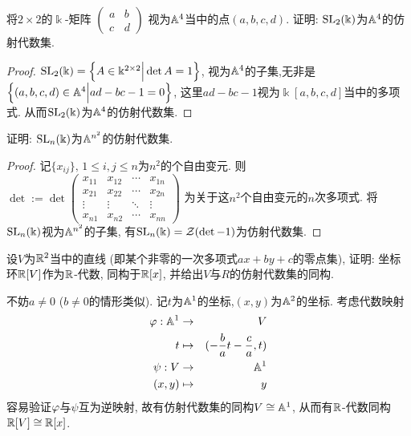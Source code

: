 \documentclass[oneside,a4papar,11pt,UTF8]{book}
\begin{document}
\begin{enumerate}
  \begin{prob}\label{ex-15-1-21}
    将$2\times 2$的$\Bbbk$-矩阵
    $\begin{pmatrix}
       a & b \\
       c & d
     \end{pmatrix}$
    视为$\mathbb{A}^4$当中的点$(a,b,c,d)$.
    证明: $\operatorname{SL}_2(\Bbbk)$为$\mathbb{A}^4$的仿射代数集.
  \end{prob}

  \begin{proof}
    $\operatorname{SL}_2(\Bbbk)=\Big\{ A\in\Bbbk^{2\times 2} \Big| \det A=1 \Big\}$,
    视为$\mathbb{A}^4$的子集,无非是
    $\Big\{ (a,b,c,d)\in\mathbb{A}^4 \Big| ad-bc-1=0 \Big\}$,
    这里$ad-bc-1$视为$\Bbbk[a,b,c,d]$当中的多项式.
    从而$\operatorname{SL}_2(\Bbbk)$为$\mathbb{A}^4$的仿射代数集.
  \end{proof}

  \begin{prob}\label{ex-15-1-22}
    证明: $\operatorname{SL}_n(\Bbbk)$为$\mathbb{A}^{n^2}$的仿射代数集.
  \end{prob}

  \begin{proof}
    记$\{x_{ij}\},\,1\leq i,j\leq n$为$n^2$的个自由变元.
    则$\det:=\det\begin{pmatrix}
                  x_{11} & x_{12} & \cdots & x_{1n} \\
                  x_{21} & x_{22} & \cdots & x_{2n} \\
                  \vdots & \vdots & \ddots & \vdots \\
                  x_{n1} & x_{n2} & \cdots & x_{nn}
                \end{pmatrix}$
  为关于这$n^2$个自由变元的$n$次多项式.
  将$\operatorname{SL}_n(\Bbbk)$视为$\mathbb{A}^{n^2}$的子集,
  有$\operatorname{SL}_n(\Bbbk)=\mathcal{Z}(\det-1)$为仿射代数集.
  \end{proof}

  \begin{prob}\label{ex-15-1-23}
    设$V$为$\mathbb{R}^2$当中的直线
    (即某个非零的一次多项式$ax+by+c$的零点集),
    证明: 坐标环$\mathbb{R}[V]$作为$\mathbb{R}$-代数,
    同构于$\mathbb{R}[x]$,
    并给出$V$与$R$的仿射代数集的同构.
  \end{prob}

  \begin{solution}
    不妨$a\neq 0$ ($b\neq 0$的情形类似).
    记$t$为$\mathbb{A}^1$的坐标,$(x,y)$为$\mathbb{A}^2$的坐标.
    考虑代数映射
    \begin{eqnarray*}
      \varphi:\mathbb{A}^1&\to& V\\
       t&\mapsto&(-\frac bat-\frac ca, t)\\
      \psi:V&\to& \mathbb{A}^1\\
       (x,y)&\mapsto& y
    \end{eqnarray*}
    容易验证$\varphi$与$\psi$互为逆映射,
    故有仿射代数集的同构$V\cong\mathbb{A}^1$,
    从而有$\mathbb{R}$-代数同构$\mathbb{R}[V]\cong\mathbb{R}[x]$.
  \end{solution}


\end{enumerate}
\end{document}
